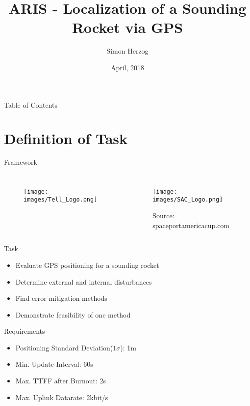 \documentclass[12pt, compress, xcolor=table]{beamer}
\title{ARIS - Localization of a Sounding Rocket via GPS}
\author{Simon Herzog}
\institute{Interim Presentation Bachelor Thesis}
\date{April, 2018}
\begin{document}
\maketitle

\begin{frame}{Table of Contents}
 \tableofcontents
\end{frame}


\section{Definition of Task}

\begin{frame}{Framework}
 \begin{columns}
  \begin{figure}
  \centering
   \texttt{[image: images/Tell\_Logo.png]}
  \end{figure}
  
  \begin{figure}
   \centering
   \texttt{[image: images/SAC\_Logo.png]}
   \caption*{Source: spaceportamericacup.com}
  \end{figure}
  
 \end{columns}
\end{frame}

\begin{frame}{Task}
 \begin{itemize}
  \setlength\itemsep{0.5cm}
  \item Evaluate GPS positioning for a sounding rocket
  \item Determine external and internal disturbances
  \item Find error mitigation methods
  \item Demonstrate feasibility of one method
 \end{itemize}
\end{frame}

\begin{frame}{Requirements}
 \begin{itemize}
  \setlength\itemsep{0.5cm}
  \item Positioning Standard Deviation($1\sigma$): 1m
  \item Min. Update Interval: 60s
  \item Max. TTFF after Burnout: 2s
  \item Max. Uplink Datarate: 2kbit/s
 \end{itemize}
\end{frame}
\end{document}
